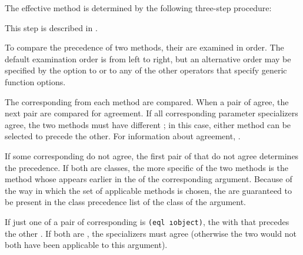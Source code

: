 The effective method is determined by the following three-step procedure:

\beginlist




\endlist


This step is described in \secref\IntroToMethods.

\endsubsubsubsection%


To compare the precedence of two methods, their 
are examined in order.  The default examination order is from left to
right, but an alternative order may be specified by the 
 option to  or to any of
the other operators that specify generic function options.

The corresponding  from each method are
compared.  When a pair of  agree, the next
pair are compared for agreement.  If all corresponding parameter
specializers agree, the two methods must have different
; in this case, either method can be selected to precede the
other.  For information about agreement, \seesection\SpecializerQualifierAgreement.

If some corresponding  do not agree, the first
pair of  that do not agree determines the
precedence.  If both  are classes, the more
specific of the two methods is the method whose 
appears earlier in the  of the corresponding
argument.  Because of the way in which the set of applicable methods
is chosen, the  are guaranteed to be present in
the class precedence list of the class of the argument.

If just one of a pair of corresponding  is {\tt (eql \i{object})},
the  with that  precedes the
other .  If both  are 
, the
specializers must agree (otherwise the two  would
not both have been applicable to this argument).

